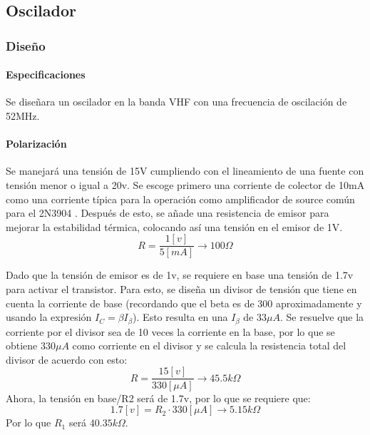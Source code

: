 \subsection{Oscilador}
%
\subsubsection{Diseño}\label{sec:0z0z0Disegno}

\paragraph{Especificaciones}
Se diseñara un oscilador en la banda VHF con una frecuencia de oscilación de 52MHz. 
\paragraph{Polarización}
Se manejará una tensión de 15V cumpliendo con el lineamiento de una fuente con tensión menor o igual a 20v. 
Se escoge primero una corriente de colector de 10mA como una corriente típica para la operación como amplificador de source común para el 2N3904 \cite{alldatasheetcom_2n3904_nodate}. 
Después de esto, se añade una resistencia de emisor para mejorar la estabilidad térmica, colocando así una tensión en el emisor de 1V. 
\begin{equation*}
    R=\frac{1[v]}{5[mA]} \xrightarrow{} 100\Omega
\end{equation*}

Dado que la tensión de emisor es de 1v, se requiere en base una tensión de 1.7v para activar el transistor. Para esto, se diseña un divisor de tensión que tiene en cuenta la corriente de base (recordando que el beta es de 300 aproximadamente y usando la expresión $I_C=\beta I_{\beta}$). Esto resulta en una $I_{\beta}$ de $33\mu A$. Se resuelve que la corriente por el divisor sea de 10 veces la corriente en la base, por lo que se obtiene $330\mu A$ como corriente en el divisor y se calcula la resistencia total del divisor de acuerdo con esto:
\begin{equation*}
    R=\frac{15[v]}{330[\mu A]} \xrightarrow{} 45.5 k\Omega    
\end{equation*}
Ahora, la tensión en base/R2 será de 1.7v, por lo que se requiere que:
\begin{equation*}
    1.7[v]=R_2 \cdot 330 [\mu A] \xrightarrow{} 5.15 k\Omega
\end{equation*}
Por lo que $R_1$ será $40.35k\Omega$.

